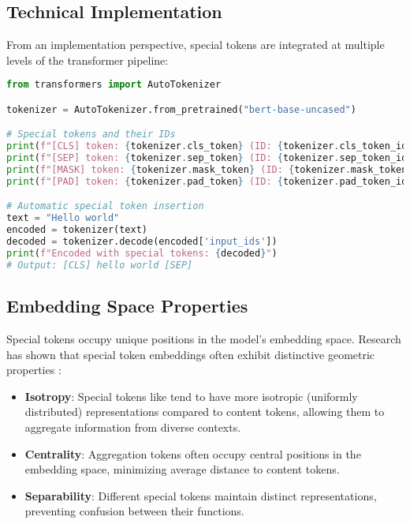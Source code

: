 \subsection{Technical Implementation}

From an implementation perspective, special tokens are integrated at multiple levels of the transformer pipeline:

\begin{lstlisting}[language=Python, caption=Tokenizer Configuration]
from transformers import AutoTokenizer

tokenizer = AutoTokenizer.from_pretrained("bert-base-uncased")

# Special tokens and their IDs
print(f"[CLS] token: {tokenizer.cls_token} (ID: {tokenizer.cls_token_id})")
print(f"[SEP] token: {tokenizer.sep_token} (ID: {tokenizer.sep_token_id})")
print(f"[MASK] token: {tokenizer.mask_token} (ID: {tokenizer.mask_token_id})")
print(f"[PAD] token: {tokenizer.pad_token} (ID: {tokenizer.pad_token_id})")

# Automatic special token insertion
text = "Hello world"
encoded = tokenizer(text)
decoded = tokenizer.decode(encoded['input_ids'])
print(f"Encoded with special tokens: {decoded}")
# Output: [CLS] hello world [SEP]
\end{lstlisting}

\subsection{Embedding Space Properties}

Special tokens occupy unique positions in the model's embedding space. Research has shown that special token embeddings often exhibit distinctive geometric properties \citep{clark2019what, rogers2020primer}:

\begin{itemize}
\item \textbf{Isotropy}: Special tokens like \cls{} tend to have more isotropic (uniformly distributed) representations compared to content tokens, allowing them to aggregate information from diverse contexts.

\item \textbf{Centrality}: Aggregation tokens often occupy central positions in the embedding space, minimizing average distance to content tokens.

\item \textbf{Separability}: Different special tokens maintain distinct representations, preventing confusion between their functions.
\end{itemize}


